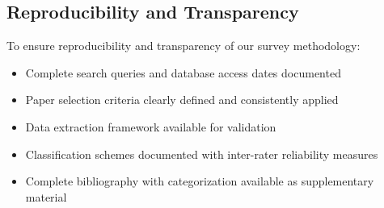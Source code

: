 \subsection{Reproducibility and Transparency}

To ensure reproducibility and transparency of our survey methodology:

\begin{itemize}
    \item Complete search queries and database access dates documented
    \item Paper selection criteria clearly defined and consistently applied
    \item Data extraction framework available for validation
    \item Classification schemes documented with inter-rater reliability measures
    \item Complete bibliography with categorization available as supplementary material
\end{itemize}

